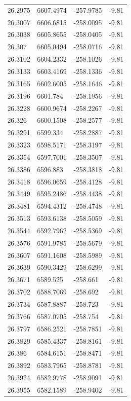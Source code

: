 \begin{table}[H]
\begin{tabular}{llll}
26.2975 & 6607.4974 & -257.9785 & -9.81 \\
26.3007 & 6606.6815 & -258.0095 & -9.81 \\
26.3038 & 6605.8655 & -258.0405 & -9.81 \\
26.307 & 6605.0494 & -258.0716 & -9.81 \\
26.3102 & 6604.2332 & -258.1026 & -9.81 \\
26.3133 & 6603.4169 & -258.1336 & -9.81 \\
26.3165 & 6602.6005 & -258.1646 & -9.81 \\
26.3196 & 6601.784 & -258.1956 & -9.81 \\
26.3228 & 6600.9674 & -258.2267 & -9.81 \\
26.326 & 6600.1508 & -258.2577 & -9.81 \\
26.3291 & 6599.334 & -258.2887 & -9.81 \\
26.3323 & 6598.5171 & -258.3197 & -9.81 \\
26.3354 & 6597.7001 & -258.3507 & -9.81 \\
26.3386 & 6596.883 & -258.3818 & -9.81 \\
26.3418 & 6596.0659 & -258.4128 & -9.81 \\
26.3449 & 6595.2486 & -258.4438 & -9.81 \\
26.3481 & 6594.4312 & -258.4748 & -9.81 \\
26.3513 & 6593.6138 & -258.5059 & -9.81 \\
26.3544 & 6592.7962 & -258.5369 & -9.81 \\
26.3576 & 6591.9785 & -258.5679 & -9.81 \\
26.3607 & 6591.1608 & -258.5989 & -9.81 \\
26.3639 & 6590.3429 & -258.6299 & -9.81 \\
26.3671 & 6589.525 & -258.661 & -9.81 \\
26.3702 & 6588.7069 & -258.692 & -9.81 \\
26.3734 & 6587.8887 & -258.723 & -9.81 \\
26.3766 & 6587.0705 & -258.754 & -9.81 \\
26.3797 & 6586.2521 & -258.7851 & -9.81 \\
26.3829 & 6585.4337 & -258.8161 & -9.81 \\
26.386 & 6584.6151 & -258.8471 & -9.81 \\
26.3892 & 6583.7965 & -258.8781 & -9.81 \\
26.3924 & 6582.9778 & -258.9091 & -9.81 \\
26.3955 & 6582.1589 & -258.9402 & -9.81 \\

\end{tabular}
\end{table}
